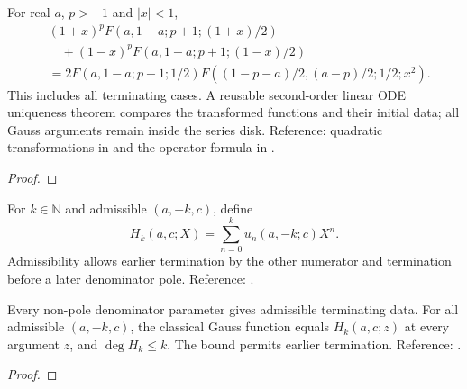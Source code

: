 \begin{supporting}
\begin{theorem}
\label{thm:hypergeometric-even-quadratic}
\leanok
For real $a$, $p>-1$ and $|x|<1$,
\begin{align*}
 &(1+x)^p F(a,1-a;p+1;(1+x)/2)\\
 &\quad +(1-x)^p F(a,1-a;p+1;(1-x)/2)\\
 &=2F(a,1-a;p+1;1/2)
 F((1-p-a)/2,(a-p)/2;1/2;x^2).
\end{align*}
This includes all terminating cases. A reusable second-order linear ODE
uniqueness theorem compares the transformed functions and their initial data;
all Gauss arguments remain inside the series disk.
Reference: quadratic transformations in \cite[15.8]{dlmf} and the operator
formula in \cite[Section 2]{gutleb-carrillo-olver}.
\end{theorem}
\begin{proof}
\leanok
\end{proof}

\begin{definition}
\label{def:hypergeometric-polynomial}
\leanok
For $k\in\mathbb N$ and admissible $(a,-k,c)$, define
\[H_k(a,c;X)=\sum_{n=0}^{k}u_n(a,-k;c)X^n.\]
Admissibility allows earlier termination by the other numerator and termination before a later denominator pole.
Reference: \cite[15.2.4--15.2.5]{dlmf}.
\end{definition}

\begin{theorem}
\label{thm:hypergeometric-polynomial}
\leanok
Every non-pole denominator parameter gives admissible terminating data.
For all admissible $(a,-k,c)$, the classical Gauss function equals $H_k(a,c;z)$
at every argument $z$, and $\deg H_k\le k$. The bound permits earlier termination.
Reference: \cite[15.2.4--15.2.5]{dlmf}.
\end{theorem}
\begin{proof}
\leanok
\end{proof}


\end{supporting}
